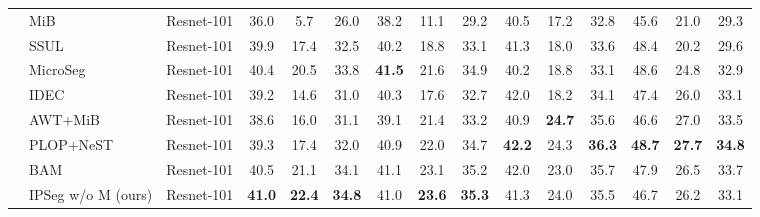 \begin{table*}[t]
{\begin{tabular}{c|l|c||ccc|ccc|ccc|ccc}
    & MiB~\citep{MiB_cermelli2020modeling} & Resnet-101 & 36.0 & 5.7 & 26.0 & 38.2 & 11.1 & 29.2 & 40.5 & 17.2 & 32.8 & 45.6 & 21.0 & 29.3\\
    & SSUL~\citep{SSUL_cha2021ssul} & Resnet-101&39.9&17.4&32.5&40.2&18.8&33.1&41.3&18.0&33.6&48.4&20.2&29.6 \\
    & MicroSeg~\citep{microseg_zhang2022mining} & Resnet-101 & 40.4&20.5&33.8&\textbf{41.5}&21.6&34.9&40.2&18.8&33.1&48.6&24.8&32.9\\
    & IDEC~\citep{idec_zhao2023inherit} & Resnet-101 & 39.2 & 14.6 & 31.0 & 40.3 & 17.6 & 32.7 & 42.0 & 18.2 & 34.1 & 47.4 & 26.0 & 33.1\\
    & AWT+MiB~\citep{goswami2023attribution} & Resnet-101 & 38.6 & 16.0 & 31.1 & 39.1 & 21.4 & 33.2 & 40.9 & \textbf{24.7} & 35.6 & 46.6 & 27.0 & 33.5 \\
    
    
    
    
    & PLOP+NeST~\citep{nest_xie2024early} & Resnet-101 & 39.3 & 17.4 & 32.0 & 40.9 & 22.0 & 34.7 & \textbf{42.2} & 24.3 & \textbf{36.3} & \textbf{48.7} & \textbf{27.7} & \textbf{34.8} \\
    & BAM~\citep{bam_zhang2025background} & Resnet-101 & 40.5 & 21.1 & 34.1 & 41.1 & 23.1 & 35.2 & 42.0 & 23.0 & 35.7 & 47.9 & 26.5 & 33.7 \\
    & IPSeg w/o M (ours) & Resnet-101 & \textbf{41.0} & \textbf{22.4} & \textbf{34.8} & 41.0 & \textbf{23.6} & \textbf{35.3} & 41.3 & 24.0 & 35.5 & 46.7 & 26.2 & 33.1 \\


\end{tabular}}
\end{table*}
